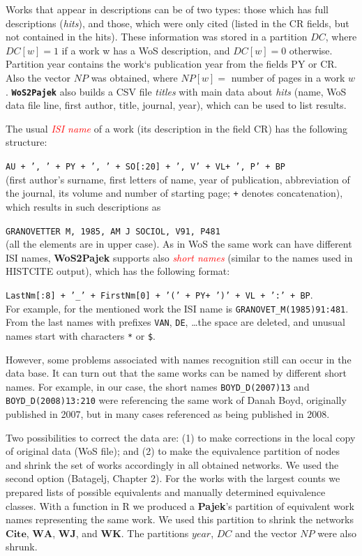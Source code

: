 \documentclass[11pt]{article} %
\newcommand{\WoSPajek}{\texttt{\textbf{WoS2Pajek}}\xspace}
\newcommand{\keyw}[1]{\textcolor{red}{\emph{#1}}}
\newcommand{\WA}{\mathbf{W\!\!A}}
\newcommand{\WK}{\mathbf{W\!K}}
\newcommand{\WJ}{\mathbf{W\!J}}
\newcommand{\Ci}{\mathbf{Cite}}
\newcommand{\NP}{N\!P}
\begin{document}
Works that appear in descriptions can be of two types: those which has full descriptions (\textit{hits}), and those, which were only cited (listed in the CR fields, but not contained in the hits). These information was stored in a partition $DC$, where $DC[w] = 1$ if a work w has a WoS description, and $DC[w] = 0$ otherwise. Partition year contains the work`s publication year from the fields PY or CR. Also the vector $\NP$ was obtained, where $\NP[w] =$ number of pages in a work $w$. \WoSPajek also builds a CSV file \textit{titles} with main data about \textit{hits} (name, WoS data file line, first author, title, journal, year), which can be used to list results. \medskip 

The usual \keyw{ISI name} of a work (its description in the field CR) has the following structure: \smallskip
 
 \texttt {AU {+ ', ' +} PY \texttt{+ ', ' +} SO[:20] \texttt{+ ', V' +} VL\texttt{+ ', P' +} BP}  \smallskip\\
(first author's surname, first letters of name, year of publication, abbreviation of the journal, its volume and number of starting page; \texttt{+} denotes concatenation), which results in such descriptions as \smallskip

\texttt{GRANOVETTER M, 1985, AM J SOCIOL, V91, P481}\smallskip\\  (all the elements are in upper case). As in WoS the same work can have different ISI names, \textbf{WoS2Pajek} supports also \keyw{short names} (similar to the names used in HISTCITE output), which has the following format:\smallskip

 \texttt {LastNm[:8] \texttt{+ '\_' +} FirstNm[0] \texttt{+ '(' +} PY\texttt{+ ')' +} VL \texttt{+ ':' +} BP}. \smallskip\\ For example, for the mentioned work the ISI name is \texttt{GRANOVET\_M(1985)91:481}. From the last names with prefixes \texttt{VAN}, \texttt{DE}, \ldots the space are deleted, and unusual names start with characters \texttt{*} or \texttt{\$}.\medskip 

However, some problems associated with names recognition still can occur in the data base. It can turn out that the same works can be named by different short names. For example, in our case, the short names \texttt {BOYD\_D(2007)13} and \texttt {BOYD\_D(2008)13:210} were referencing the same work of Danah Boyd, originally published in 2007, but in many cases referenced as being published in 2008. \medskip 

Two possibilities to correct the data are: (1) to make corrections in the local copy of original data (WoS file); and (2) to make the equivalence partition of nodes and shrink the set of works accordingly in all  obtained networks. We used the second option (Batagelj, Chapter 2). For the works with the largest counts we prepared lists of possible equivalents and manually determined equivalence classes. With a function in R we produced a \textbf{Pajek}'s partition of equivalent work names representing the same work. We used this partition to shrink the networks $\Ci$, $\WA$, $\WJ$, and $\WK$. The partitions $year$,  $DC$ and the vector $\NP$ were also shrunk.  \medskip 
\end{document}
